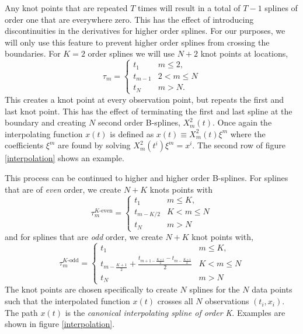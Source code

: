 \documentclass[10pt,journal]{IEEEtran}
\begin{document}
Any knot points that are repeated $T$ times will result in a total of $T-1$ splines of order one that are everywhere zero. This has the effect of introducing discontinuities in the derivatives for higher order splines. For our purposes, we will only use this feature to prevent higher order splines from crossing the boundaries. For $K=2$ order splines we will use $N+2$ knot points at locations,
\begin{equation}
\tau_m = \begin{cases}
t_1      	& \text{$m \leq 2$}, \\
t_{m-1}	& \text{$2 < m \leq N$}\\
t_N 		& \text{$m > N$}.
\end{cases}
\end{equation}
This creates a knot point at every observation point, but repeats the first and last knot point. This has the effect of terminating the first and last spline at the boundary and creating $N$ second order B-splines, $X^2_m(t)$. Once again the interpolating function $x(t)$ is defined as $x(t) \equiv  X^2_m(t) \xi^m$ where the coefficients $\xi^m$ are found by solving $X^2_m(t^i) \xi^m = x^i$. The second row of figure \ref{interpolation} shows an example.

This process can be continued to higher and higher order B-splines. For splines that are of \emph{even} order, we create $N+K$ knots points with
\begin{equation}
\tau_m^{\text{$K$-even}} = \begin{cases}
t_1      	& \text{$m \leq K$}, \\
t_{m-K/2}	& \text{$K < m \leq N$}\\
t_N 		& \text{$m > N$}
\end{cases}
\label{even-knots}
\end{equation}
and for splines that are \emph{odd} order, we create $N+K$ knot points with,
\begin{equation}
\tau_m^{\text{$K$-odd}} = \begin{cases}
t_1      	& \text{$m \leq K$}, \\
t_{m-\frac{K+1}{2}} + \frac{t_{m+1-\frac{K+1}{2}}-t_{m-\frac{K+1}{2}}}{2}	& \text{$K < m \leq N$}\\
t_N 		& \text{$m > N$}
\end{cases}
\label{odd-knots}
\end{equation}
The knot points are chosen specifically to create $N$ splines for the $N$ data points such that the interpolated function $x(t)$ crosses all $N$ observations $(t_i,x_i)$. The path $x(t)$ is the \emph{canonical interpolating spline of order K}. Examples are shown in figure \ref{interpolation}.
\end{document}
